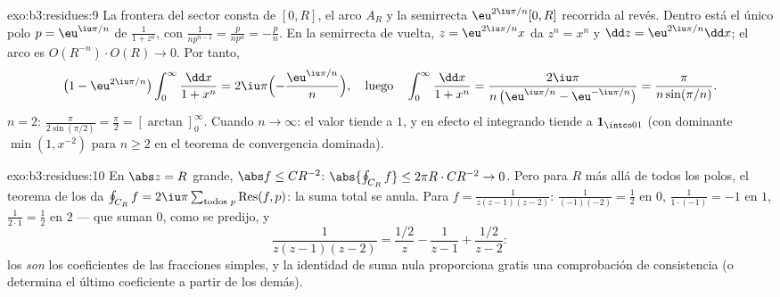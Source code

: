 \begin{solution}{exo:b3:residues:9}
La frontera del sector consta de $[0, R]$, el arco $A_R$ y la semirrecta
$\eu^{2\iu\pi/n}[0, R]$ recorrida al revés. Dentro está el único polo
$p = \eu^{\iu\pi/n}$ de $\frac1{1+z^n}$, con
$\frac1{np^{n-1}} = \frac{p}{np^n} = -\frac pn$. En la semirrecta de
vuelta, $z = \eu^{2\iu\pi/n}x$ da $z^n = x^n$ y
$\dd z = \eu^{2\iu\pi/n}\dd x$; el arco es $O(R^{-n})\cdot O(R) \to 0$.
Por tanto,
\[
\bigl(1 - \eu^{2\iu\pi/n}\bigr)
\int_0^\infty\frac{\dd x}{1 + x^n}
= 2\iu\pi\Bigl(-\frac{\eu^{\iu\pi/n}}n\Bigr),
\quad\text{luego}\quad
\int_0^\infty\frac{\dd x}{1+x^n}
= \frac{2\iu\pi}{n\,\bigl(\eu^{\iu\pi/n} -
\eu^{-\iu\pi/n}\bigr)} = \frac{\pi}{n\sin(\pi/n)} .
\]
$n = 2$: $\frac\pi{2\sin(\pi/2)} = \frac\pi2 =
[\arctan]_0^\infty$. Cuando $n \to \infty$: el valor tiende a $1$, y en
efecto el integrando tiende a $\mathbf 1_{\intco01}$ (con dominante
$\min(1, x^{-2})$ para $n \geq 2$ en el teorema de convergencia
dominada).
\end{solution}

\begin{solution}{exo:b3:residues:10}
En $\abs z = R$ grande, $\abs f \leq C R^{-2}$: $\abs{\oint_{C_R}
f} \leq 2\pi R\cdot CR^{-2} \to 0$. Pero para $R$ más allá de todos los
polos, el teorema de los
 da $\oint_{C_R}f =
2\iu\pi\sum_{\text{todos }p}\operatorname{Res}(f, p)$: la suma total se
anula. Para $f = \frac1{z(z-1)(z-2)}$:
$\frac1{(-1)(-2)} = \frac12$ en $0$, $\frac1{1\cdot(-1)} = -1$ en $1$,
$\frac1{2\cdot1} = \frac12$ en $2$ --- que suman $0$, como se predijo, y
\[
\frac1{z(z-1)(z-2)} = \frac{1/2}{z} - \frac1{z - 1} +
\frac{1/2}{z-2} :
\]
los  \emph{son} los
coeficientes de las fracciones simples, y la identidad de suma nula
proporciona gratis una comprobación de consistencia (o determina el
último coeficiente a partir de los demás).
\end{solution}

